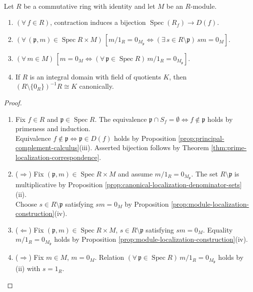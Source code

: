 \begin{proposition} \label{prop:canonical-localization-consequences}
\\
Let $R$ be a commutative ring with identity and let $M$ be an $R$-module.
\begin{enumerate}[label=(\roman*)]
\setlength{\itemsep}{0pt}
\item $(\forall\,f\in R)$, contraction induces a bijection $\operatorname{Spec}(R_f)\to D(f)$.
\item $(\forall\,(\mathfrak{p},m)\in\operatorname{Spec}R\times M)\,[m/1_R=0_{M_{\mathfrak{p}}}\Longleftrightarrow(\exists\,s\in R\setminus\mathfrak{p})\,sm=0_M]$.
\item $(\forall\,m\in M)\,[m=0_M\Longleftrightarrow(\forall\,\mathfrak{p}\in\operatorname{Spec}R)\,m/1_R=0_{M_{\mathfrak{p}}}]$.
\item If $R$ is an integral domain with field of quotients $K$, then $(R\setminus\{0_R\})^{-1}R\cong K$ canonically.
\end{enumerate}
\begin{proof}
\begin{enumerate}[label=(\roman*)]
\setlength{\itemsep}{0pt}
\item[$(i)$] Fix $f\in R$ and $\mathfrak{p}\in\operatorname{Spec}R$. The equivalence $\mathfrak{p}\cap S_f=\emptyset\Longleftrightarrow f\notin\mathfrak{p}$ holds by primeness and induction.\\
Equivalence $f\notin\mathfrak{p}\Longleftrightarrow\mathfrak{p}\in D(f)$ holds by Proposition \ref{prop:principal-complement-calculus}(iii). Asserted bijection follows by Theorem \ref{thm:prime-localization-correspondence}.
\item[$(ii)$] ($\Rightarrow$) Fix $(\mathfrak{p},m)\in\operatorname{Spec}R\times M$ and assume $m/1_R=0_{M_{\mathfrak{p}}}$. The set $R\setminus\mathfrak{p}$ is multiplicative by Proposition \ref{prop:canonical-localization-denominator-sets}(ii).\\
Choose $s\in R\setminus\mathfrak{p}$ satisfying $sm=0_M$ by Proposition \ref{prop:module-localization-construction}(iv).
\item[$(ii)$] ($\Leftarrow$) Fix $(\mathfrak{p},m)\in\operatorname{Spec}R\times M$, $s\in R\setminus\mathfrak{p}$ satisfying $sm=0_M$. Equality $m/1_R=0_{M_{\mathfrak{p}}}$ holds by Proposition \ref{prop:module-localization-construction}(iv).
\item[$(iii)$] ($\Rightarrow$) Fix $m\in M$, $m=0_M$. Relation $(\forall\,\mathfrak{p}\in\operatorname{Spec}R)\,m/1_R=0_{M_{\mathfrak{p}}}$ holds by (ii) with $s=1_R$.

\end{enumerate}
\end{proof}
\end{proposition}
